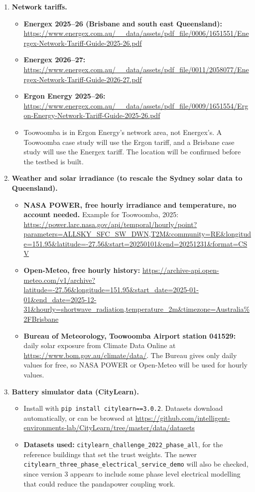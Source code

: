 \documentclass[11pt,a4paper]{article}
\begin{document}
\begin{enumerate}[leftmargin=1.6em, itemsep=6pt]
\item \textbf{Network tariffs.}
\begin{itemize}
  \item \textbf{Energex 2025--26 (Brisbane and south east Queensland):} \url{https://www.energex.com.au/__data/assets/pdf_file/0006/1651551/Energex-Network-Tariff-Guide-2025-26.pdf}~\cite{energex_tariff}
  \item \textbf{Energex 2026--27:} \url{https://www.energex.com.au/__data/assets/pdf_file/0011/2058077/Energex-Network-Tariff-Guide-2026-27.pdf}
  \item \textbf{Ergon Energy 2025--26:} \url{https://www.energex.com.au/__data/assets/pdf_file/0009/1651554/Ergon-Energy-Network-Tariff-Guide-2025-26.pdf}
  \item Toowoomba is in Ergon Energy's network area, not Energex's. A Toowoomba case study will use the Ergon tariff, and a Brisbane case study will use the Energex tariff. The location will be confirmed before the testbed is built.
\end{itemize}

\item \textbf{Weather and solar irradiance (to rescale the Sydney solar data to Queensland).}
\begin{itemize}
  \item \textbf{NASA POWER, free hourly irradiance and temperature, no account needed.} Example for Toowoomba, 2025: \url{https://power.larc.nasa.gov/api/temporal/hourly/point?parameters=ALLSKY_SFC_SW_DWN,T2M&community=RE&longitude=151.95&latitude=-27.56&start=20250101&end=20251231&format=CSV}
  \item \textbf{Open-Meteo, free hourly history:} \url{https://archive-api.open-meteo.com/v1/archive?latitude=-27.56&longitude=151.95&start_date=2025-01-01&end_date=2025-12-31&hourly=shortwave_radiation,temperature_2m&timezone=Australia%2FBrisbane}
  \item \textbf{Bureau of Meteorology, Toowoomba Airport station 041529:} daily solar exposure from Climate Data Online at \url{https://www.bom.gov.au/climate/data/}. The Bureau gives only daily values for free, so NASA POWER or Open-Meteo will be used for hourly values.
\end{itemize}

\item \textbf{Battery simulator data (CityLearn).}
\begin{itemize}
  \item Install with \texttt{pip install citylearn==3.0.2}. Datasets download automatically, or can be browsed at \url{https://github.com/intelligent-environments-lab/CityLearn/tree/master/data/datasets}
  \item \textbf{Datasets used:} \texttt{citylearn\_challenge\_2022\_phase\_all}, for the reference buildings that set the trust weights. The newer \texttt{citylearn\_three\_phase\_electrical\_service\_demo} will also be checked, since version 3 appears to include some phase level electrical modelling that could reduce the pandapower coupling work.
\end{itemize}


\end{enumerate}
\end{document}
